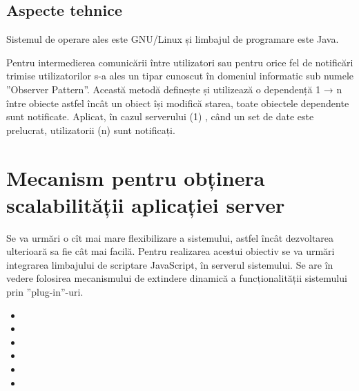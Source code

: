 \subsection{Aspecte tehnice}
\par Sistemul de operare ales este GNU/Linux și limbajul de programare este Java.
\par Pentru intermedierea comunicării între utilizatori sau pentru orice fel de notificări trimise utilizatorilor s-a ales un tipar cunoscut în domeniul informatic sub numele ”Observer Pattern”. Această metodă definește și utilizează o dependență 1 → n între obiecte astfel încât un obiect își modifică starea, toate obiectele dependente sunt notificate. Aplicat, în cazul serverului (1) , când un set de date este prelucrat, utilizatorii (n) sunt notificați.

\section{Mecanism pentru obținera \\ scalabilității aplicației server}

\par Se va urmări o cît mai mare flexibilizare a sistemului, astfel încât dezvoltarea ulterioară sa fie cât mai facilă. Pentru realizarea acestui obiectiv se va urmări integrarea limbajului de scriptare JavaScript, în serverul sistemului. Se are în vedere folosirea mecanismului de extindere dinamică a funcționalității sistemului prin ”plug-in”-uri. 
\par 
\par 
\begin{itemize}
\item 
\item 
\item 
\item
\item
\item
\end{itemize}